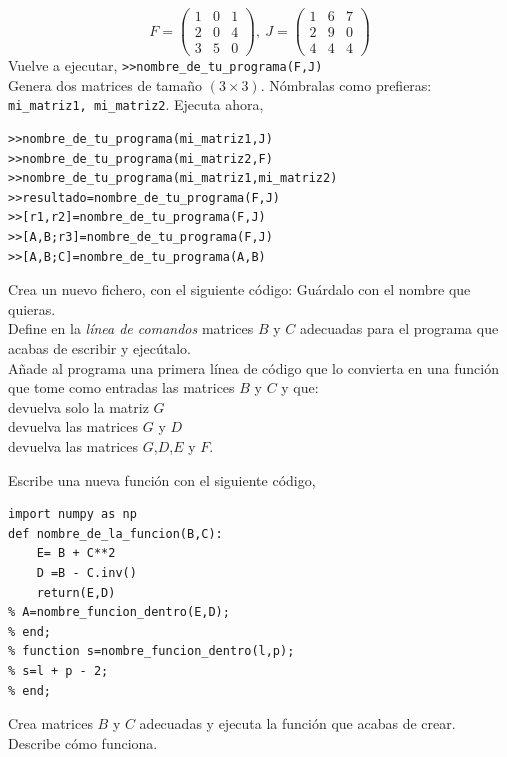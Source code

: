 \begin{enumerate}
\begin{equation*}
F =\begin{pmatrix}
1&0&1\\
2&0&4\\
3&5&0
\end{pmatrix}, \ J=\begin{pmatrix}
1&6&7\\
2&9&0\\
4&4&4
\end{pmatrix}
\end{equation*}
Vuelve a ejecutar, \verb|>>nombre_de_tu_programa(F,J)| \\
Genera dos matrices de tamaño $(3\times 3)$. Nómbralas como prefieras: \verb|mi_matriz1, mi_matriz2|. Ejecuta ahora,
\begin{verbatim}
>>nombre_de_tu_programa(mi_matriz1,J)
>>nombre_de_tu_programa(mi_matriz2,F)
>>nombre_de_tu_programa(mi_matriz1,mi_matriz2)
>>resultado=nombre_de_tu_programa(F,J)
>>[r1,r2]=nombre_de_tu_programa(F,J)
>>[A,B;r3]=nombre_de_tu_programa(F,J)
>>[A,B;C]=nombre_de_tu_programa(A,B)
\end{verbatim}
Crea un nuevo fichero, con el siguiente código:
Guárdalo con el nombre que quieras.\\
Define en la \emph{línea de comandos} matrices $B$ y $C$ adecuadas para el programa que acabas de escribir y ejecútalo.\\
Añade al programa una primera línea de código que lo convierta en una función que tome como entradas las matrices $B$ y $C$  y que:\\
devuelva solo la matriz $G$\\
devuelva las matrices $G$ y $D$\\ 
devuelva las matrices $G$,$D$,$E$ y $F$.

Escribe una nueva función con el siguiente código,
\begin{verbatim}
import numpy as np
def nombre_de_la_funcion(B,C):
    E= B + C**2
    D =B - C.inv()
    return(E,D)
% A=nombre_funcion_dentro(E,D);
% end;
% function s=nombre_funcion_dentro(l,p);
% s=l + p - 2;
% end;
\end{verbatim}

Crea matrices $B$ y $C$ adecuadas y ejecuta la función que acabas de crear. Describe cómo funciona.


\end{enumerate}
